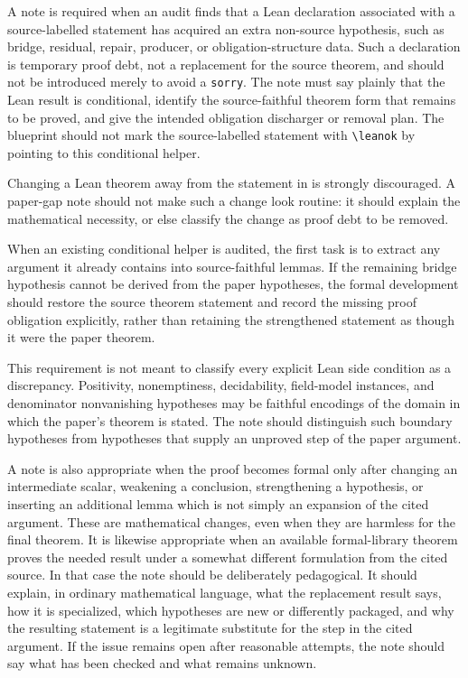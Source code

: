\documentclass[11pt]{article}
\begin{document}
A note is required when an audit finds that a Lean declaration associated with a
source-labelled statement has acquired an extra non-source hypothesis, such as
bridge, residual, repair, producer, or obligation-structure data.  Such a
declaration is temporary proof debt, not a replacement for the source theorem,
and should not be introduced merely to avoid a \verb|sorry|.  The note must say
plainly that the Lean result is conditional, identify the source-faithful theorem
form that remains to be proved, and give the intended obligation discharger or
removal plan.  The blueprint should not mark the source-labelled statement with
\verb|\leanok| by pointing to this conditional helper.

Changing a Lean theorem away from the statement in
 is strongly discouraged.  A paper-gap note should
not make such a change look routine: it should explain the mathematical
necessity, or else classify the change as proof debt to be removed.

When an existing conditional helper is audited, the first task is to extract any
argument it already contains into source-faithful lemmas.  If the remaining
bridge hypothesis cannot be derived from the paper hypotheses, the formal
development should restore the source theorem statement and record the missing
proof obligation explicitly, rather than retaining the strengthened statement as
though it were the paper theorem.

This requirement is not meant to classify every explicit Lean side condition as
a discrepancy.  Positivity, nonemptiness, decidability, field-model instances,
and denominator nonvanishing hypotheses may be faithful encodings of the domain
in which the paper's theorem is stated.  The note should distinguish such
boundary hypotheses from hypotheses that supply an unproved step of the paper
argument.

A note is also appropriate when the proof becomes formal only after changing an
intermediate scalar, weakening a conclusion, strengthening a hypothesis, or
inserting an additional lemma which is not simply an expansion of the cited
argument.  These are mathematical changes, even when they are harmless for the
final theorem.  It is likewise appropriate when an available formal-library
theorem proves the needed result under a somewhat different formulation from the
cited source.  In that case the note should be deliberately pedagogical.  It
should explain, in ordinary mathematical language, what the replacement result
says, how it is specialized, which hypotheses are new or differently packaged,
and why the resulting statement is a legitimate substitute for the step in the
cited argument.  If the issue remains open after reasonable attempts, the note
should say what has been checked and what remains unknown.
\end{document}
